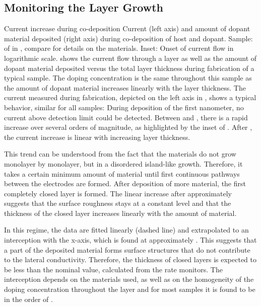 \subsection{Monitoring the Layer Growth}\label{sec:ExpLayerGroth}
{Current increase during co-deposition}
{Current (left axis) and amount of dopant material deposited (right axis) during co-deposition of host and dopant. Sample: \C[0.022] of \CrPd in \CS, compare  for details on the materials. Inset: Onset of current flow in logarithmic scale.}
%
 shows the current flow through a layer as well as the amount of dopant material deposited versus the total layer thickness during fabrication of a typical sample.
The doping concentration is the same throughout this sample as the amount of dopant material increases linearly with the layer thickness. The current measured during fabrication, depicted on the left axis in , shows a typical behavior, similar for all samples: During deposition of the first nanometer, no current above detection limit could be detected. Between  and , there is a rapid increase over several orders of magnitude, as highlighted by the inset of . After , the current increase is linear with increasing layer thickness.

This trend can be understood from the fact that the materials do not grow monolayer by monolayer, but in a disordered island-like growth.
Therefore, it takes a certain minimum amount of material until first continuous pathways between the electrodes are formed. After deposition of more material, the first completely closed layer is formed. The linear increase after approximately  suggests that the surface roughness stays at a constant level and that the thickness of the closed layer increases linearly with the amount of material.

In this regime, the data are fitted linearly (dashed line) and extrapolated to an interception with the x-axis, which is found at approximately . This suggests that a part of the deposited material forms surface structures that do not contribute to the lateral conductivity. Therefore, the thickness of closed layers is expected to be less than the nominal value, calculated from the rate monitors. The interception depends on the materials used, as well as on the homogeneity of the doping concentration throughout the layer and for most samples it is found to be in the order of .

